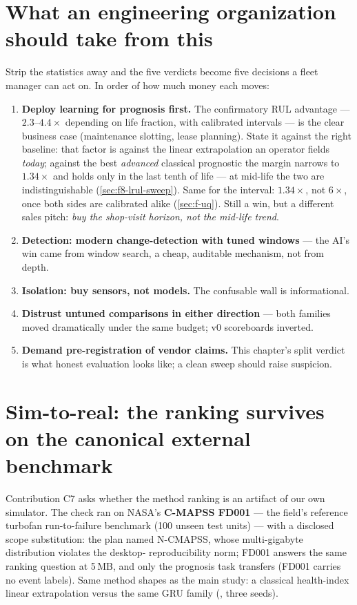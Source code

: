 \section{What an engineering organization should take from this}
\label{sec:res-industry}

Strip the statistics away and the five verdicts become five decisions a fleet manager can
act on. In order of how much money each moves:

\begin{enumerate}
  \item \textbf{Deploy learning for prognosis first.} The confirmatory RUL advantage ---
    $2.3$--$4.4\times$ depending on life fraction, with calibrated intervals --- is the clear
    business case (maintenance slotting, lease planning). State it against the right baseline:
    that factor is against the linear extrapolation an operator fields \emph{today}; against
    the best \emph{advanced} classical prognostic the margin narrows to $1.34\times$ and holds
    only in the last tenth of life --- at mid-life the two are indistinguishable
    (\cref{sec:f8-lrul-sweep}). Same for the interval: $1.34\times$, not $6\times$, once both
    sides are calibrated alike (\cref{sec:f-uq}). Still a win, but a different sales pitch:
    \emph{buy the shop-visit horizon, not the mid-life trend}.
  \item \textbf{Detection: modern change-detection with tuned windows} --- the AI's win came
    from window search, a cheap, auditable mechanism, not from depth.
  \item \textbf{Isolation: buy sensors, not models.} The confusable wall is informational.
  \item \textbf{Distrust untuned comparisons in either direction} --- both families moved
    dramatically under the same budget; v0 scoreboards inverted.
  \item \textbf{Demand pre-registration of vendor claims.} This chapter's split verdict is
    what honest evaluation looks like; a clean sweep should raise suspicion.
\end{enumerate}

\section{Sim-to-real: the ranking survives on the canonical external benchmark}
\label{sec:sim-to-real}

Contribution C7 asks whether the method ranking is an artifact of our own simulator. The
check ran on NASA's \textbf{C-MAPSS FD001} --- the field's reference turbofan
run-to-failure benchmark (100 unseen test units) --- with a disclosed scope substitution:
the plan named N-CMAPSS, whose multi-gigabyte distribution violates the desktop-
reproducibility norm; FD001 answers the same ranking question at 5\,MB, and only the
prognosis task transfers (FD001 carries no event labels). Same method shapes as the main
study: a classical health-index linear extrapolation versus the same GRU family
(, three seeds).

